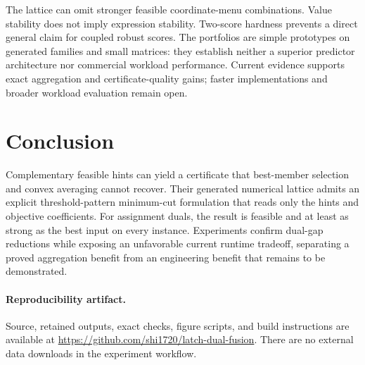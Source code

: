 \documentclass[10pt,letterpaper]{article}
\begin{document}
The lattice can omit stronger feasible coordinate-menu combinations. Value stability does not imply expression stability. Two-score hardness prevents a direct general claim for coupled robust scores. The portfolios are simple prototypes on generated families and small matrices: they establish neither a superior predictor architecture nor commercial workload performance. Current evidence supports exact aggregation and certificate-quality gains; faster implementations and broader workload evaluation remain open.

\section{Conclusion}
Complementary feasible hints can yield a certificate that best-member selection and convex averaging cannot recover. Their generated numerical lattice admits an explicit threshold-pattern minimum-cut formulation that reads only the hints and objective coefficients. For assignment duals, the result is feasible and at least as strong as the best input on every instance. Experiments confirm dual-gap reductions while exposing an unfavorable current runtime tradeoff, separating a proved aggregation benefit from an engineering benefit that remains to be demonstrated.

\paragraph{Reproducibility artifact.}
Source, retained outputs, exact checks, figure scripts, and build instructions are available at \url{https://github.com/shi1720/latch-dual-fusion}. There are no external data downloads in the experiment workflow.
\end{document}
